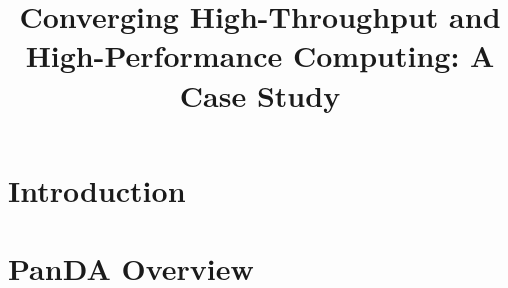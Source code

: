 \documentclass[conference]{IEEEtran}
\begin{document}
\title{Converging High-Throughput and High-Performance Computing: A Case Study}

% 


\maketitle
\begin{abstract}

\end{abstract}


\section{Introduction}
\label{sec:intro}



\section{PanDA Overview}
\label{sec:panda_overview}

\end{document}
